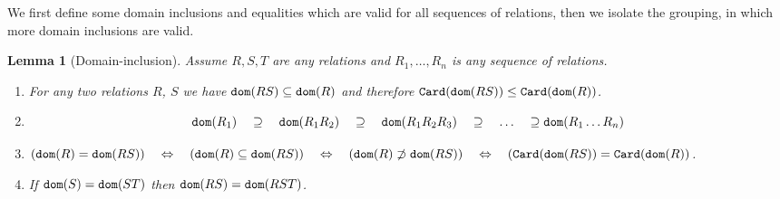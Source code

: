 \documentclass{lmcs}
\newtheorem{lemma}[theorem]{Lemma}
\begin{document}
We first define some domain inclusions and equalities 
which are valid for all sequences of relations, then we isolate the 
grouping, in which more domain inclusions are valid. 

\begin{lemma}[Domain-inclusion]
\label{lemma-domain-inclusion}
Assume $R, S, T$ are any relations and $R_1, \ldots, R_n$ is any sequence of relations.
\begin{enumerate}

\item
\label{lemma-domain-inclusion-01}
For any two relations $R$, $S$ we have ${\tt dom}(RS) \subseteq {\tt dom}(R)$
and therefore ${\tt Card}({\tt dom}(RS)) \le {\tt Card}({\tt dom}(R))$.

\item
\label{lemma-domain-inclusion-02}

$$
\dom(R_1)   \ \ \  \supseteq  \ \ \ 
\dom(R_1 R_2)    \ \ \  \supseteq  \ \ \ 
\dom(R_1 R_2 R_3)    \ \ \  \supseteq  \ \ \  
\ldots   \ \ \  \supseteq
\dom(R_1 \ldots R_n)
$$

\item
\label{lemma-domain-inclusion-03}
$
(\dom(R) = \dom(RS))  
\ \ \  \Leftrightarrow \ \ \ 
(\dom(R) \subseteq \dom(RS)) 
\ \ \  \Leftrightarrow \ \ \  
(\dom(R) \not \supset  \dom(RS))
\ \ \  \Leftrightarrow \ \ \ 
(\Card(\dom(RS)) = \Card(\dom(R))
$.

\item
\label{lemma-domain-inclusion-04}
If ${\tt dom}(S) = {\tt dom}(ST)$ then 
${\tt dom}(RS) = {\tt dom}(RST)$.

\end{enumerate}
\end{lemma}
\end{document}
